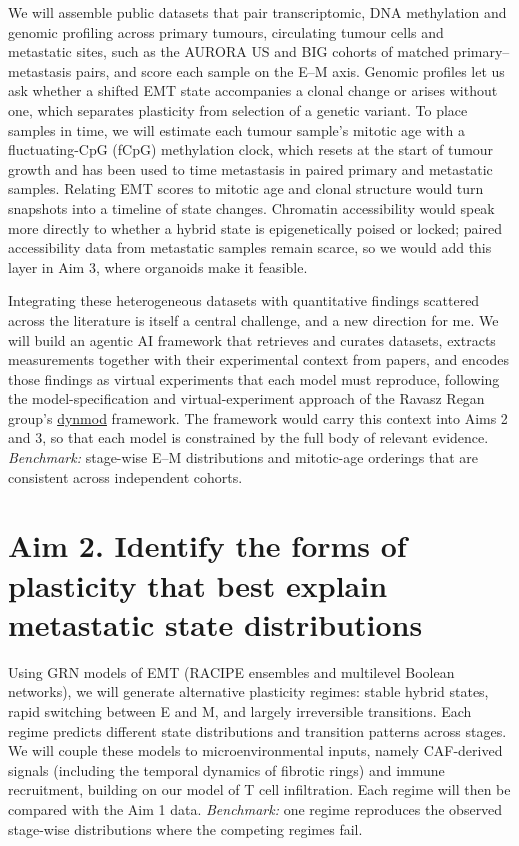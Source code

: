 \documentclass[11pt]{article}
\begin{document}
We will assemble public datasets that pair transcriptomic, DNA methylation and genomic profiling across primary tumours, circulating tumour cells and metastatic sites, such as the AURORA US and BIG cohorts of matched primary--metastasis pairs, and score each sample on the E--M axis. Genomic profiles let us ask whether a shifted EMT state accompanies a clonal change or arises without one, which separates plasticity from selection of a genetic variant. To place samples in time, we will estimate each tumour sample's mitotic age with a fluctuating-CpG (fCpG) methylation clock, which resets at the start of tumour growth and has been used to time metastasis in paired primary and metastatic samples. Relating EMT scores to mitotic age and clonal structure would turn snapshots into a timeline of state changes. Chromatin accessibility would speak more directly to whether a hybrid state is epigenetically poised or locked; paired accessibility data from metastatic samples remain scarce, so we would add this layer in Aim 3, where organoids make it feasible.

Integrating these heterogeneous datasets with quantitative findings scattered across the literature is itself a central challenge, and a new direction for me. We will build an agentic AI framework that retrieves and curates datasets, extracts measurements together with their experimental context from papers, and encodes those findings as virtual experiments that each model must reproduce, following the model-specification and virtual-experiment approach of the Ravasz Regan group's \href{https://github.com/Ravasz-Regan-Group/dynmod}{dynmod} framework. The framework would carry this context into Aims 2 and 3, so that each model is constrained by the full body of relevant evidence. \textit{Benchmark:} stage-wise E--M distributions and mitotic-age orderings that are consistent across independent cohorts.

\section{Aim 2. Identify the forms of plasticity that best explain metastatic state distributions}

Using GRN models of EMT (RACIPE ensembles and multilevel Boolean networks), we will generate alternative plasticity regimes: stable hybrid states, rapid switching between E and M, and largely irreversible transitions. Each regime predicts different state distributions and transition patterns across stages. We will couple these models to microenvironmental inputs, namely CAF-derived signals (including the temporal dynamics of fibrotic rings) and immune recruitment, building on our model of T cell infiltration. Each regime will then be compared with the Aim 1 data. \textit{Benchmark:} one regime reproduces the observed stage-wise distributions where the competing regimes fail.
\end{document}
